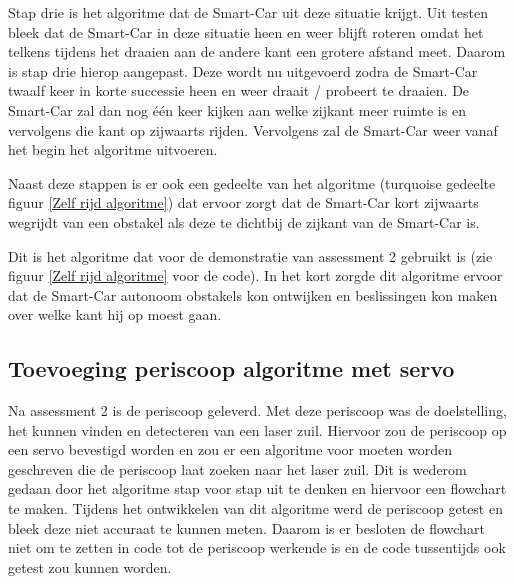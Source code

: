 Stap drie is het algoritme dat de \gls{Smart-Car} uit deze situatie krijgt. Uit testen bleek dat de \gls{Smart-Car} in deze situatie heen en weer blijft roteren omdat het telkens tijdens het draaien aan de andere kant een grotere afstand meet. Daarom is stap drie hierop aangepast. Deze wordt nu uitgevoerd zodra de \gls{Smart-Car} twaalf keer in korte successie heen en weer draait / probeert te draaien. De \gls{Smart-Car} zal dan nog één keer kijken aan welke zijkant meer ruimte is en vervolgens die kant op zijwaarts rijden. Vervolgens zal de \gls{Smart-Car} weer vanaf het begin het algoritme uitvoeren. 

Naast deze stappen is er ook een gedeelte van het algoritme (turquoise gedeelte figuur \ref{Zelf rijd algoritme}) dat ervoor zorgt dat de \gls{Smart-Car} kort zijwaarts wegrijdt van een obstakel als deze te dichtbij de zijkant van de \gls{Smart-Car} is. 

Dit is het algoritme dat voor de demonstratie van assessment 2 gebruikt is (zie figuur \ref{Zelf rijd algoritme} voor de code). In het kort zorgde dit algoritme ervoor dat de \gls{Smart-Car} autonoom obstakels kon ontwijken en beslissingen kon maken over welke kant hij op moest gaan. 

\subsection{Toevoeging periscoop algoritme met servo}
Na assessment 2 is de periscoop geleverd. Met deze periscoop was de doelstelling, het kunnen vinden en detecteren van een laser zuil. Hiervoor zou de periscoop op een servo bevestigd worden en zou er een algoritme voor moeten worden geschreven die de periscoop laat zoeken naar het laser zuil. Dit is wederom gedaan door het algoritme stap voor stap uit te denken en hiervoor een flowchart te maken. Tijdens het ontwikkelen van dit algoritme werd de periscoop getest en bleek deze niet accuraat te kunnen meten. Daarom is er besloten de flowchart niet om te zetten in code tot de periscoop werkende is en de code tussentijds ook getest zou kunnen worden. 

